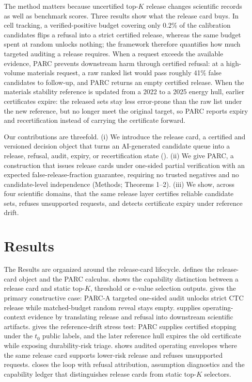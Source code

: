 \documentclass[10pt,twocolumn]{article}
\begin{document}
The method matters because uncertified top-\(K\) release changes scientific records as well as benchmark scores.
Three results show what the release card buys.
In cell tracking, a verified-positive budget covering only 0.2\% of the calibration candidates flips a refusal into a strict certified release, whereas the same budget spent at random unlocks nothing; the framework therefore quantifies how much targeted auditing a release requires.
When a request exceeds the available evidence, PARC prevents downstream harm through certified refusal: at a high-volume materials request, a raw ranked list would pass roughly 41\% false candidates to follow-up, and PARC returns an empty certified release.
When the materials stability reference is updated from a 2022 to a 2025 energy hull, earlier certificates expire: the released sets stay less error-prone than the raw list under the new reference, but no longer meet the original target, so PARC reports expiry and recertification instead of carrying the certificate forward.

Our contributions are threefold.
(i) We introduce the release card, a certified and versioned decision object that turns an AI-generated candidate queue into a release, refusal, audit, expiry, or recertification state ().
(ii) We give PARC, a construction that issues release cards under one-sided partial verification with an expected false-release-fraction guarantee, requiring no trusted negatives and no candidate-level independence (Methods; Theorems 1--2).
(iii) We show, across four scientific domains, that the same release layer certifies reliable candidate sets, refuses unsupported requests, and detects certificate expiry under reference drift.

\section{Results}

The Results are organized around the release-card lifecycle.
 defines the release-card object and the PARC calculus.
 shows the capability distinction between a release card and static top-\(K\), threshold or e-value selection outputs.
 gives the primary constructive case: PARC-A targeted one-sided audit unlocks strict CTC release while matched-budget random reveal stays empty.
 supplies operating-context evidence by translating release and refusal into downstream scientific artifacts.
 gives the reference-drift stress test: PARC supplies certified stopping under the \(t_0\) public labels, and the later reference hull expires the old certificate while exposing durability-risk triage.
 shows audited operating envelopes where the same release card supports lower-risk release and refuses unsupported requests.
 closes the loop with refusal attribution, assumption diagnostics and the capability ledger that distinguishes release cards from static top-\(K\) selectors.
\end{document}
